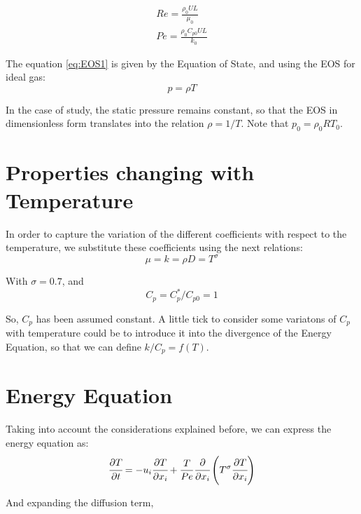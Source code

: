 \documentclass[titlepage,11pt]{article}
\newcommand\ppt[1]{\cfrac{\partial#1}{\partial t}} %
\newcommand\ppi[1]{\cfrac{\partial#1}{\partial x_i}} %
\begin{document}
\begin{equation}
	\begin{array}{lcl}
		Re=\frac{\rho_0 U L}{\mu_0}  \\
		Pe=\frac{\rho_0 C_{p0} U L}{k_0}  
	\end{array}
\end{equation}




The equation \ref{eq:EOS1} is given by the Equation of State, and using the EOS for ideal gas:
\begin{equation}
p = \rho T
\label{eq:EOS2}
\end{equation}

In the case of study, the static pressure remains constant, so that the EOS in dimensionless form translates into the relation $\rho=1/T$. Note that $p_0=\rho_0 R T_0$.

\section{Properties changing with Temperature}

In order to capture the variation of the different coefficients with respect to the temperature, we substitute these coefficients using the next relations:
\begin{equation}
\mu=k=\rho D=T^{\sigma}
\end{equation}

With $\sigma=0.7$, and
\begin{equation}
	C_p=C_p^{*}/C_{p0}=1
\end{equation}

So, $C_p$ has been assumed constant. A little tick to consider some variatons of $C_p$ with temperature could be to introduce it into the divergence of the Energy Equation, so that we can define $k/C_p=f(T)$.

\section{Energy Equation}

Taking into account the considerations explained before, we can express the energy equation as:
 \begin{equation}
	\ppt{T}=-u_i \ppi{T}+\frac{T}{Pe}\ppi{}\left( T^{\sigma} \ppi{T} \right)
	\label{energy2}
\end{equation}

And expanding the diffusion term,
\end{document}
